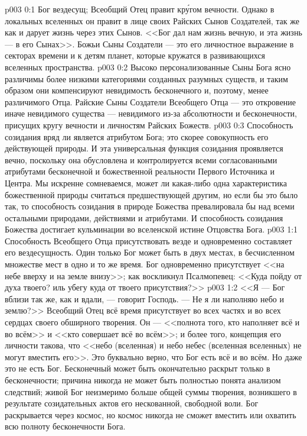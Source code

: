 \author{Божественный Советник}
\vs p003 0:1 Бог вездесущ; Всеобщий Отец правит кр\'угом вечности. Однако в локальных вселенных он правит в лице своих Райских Сынов Создателей, так же как и дарует жизнь через этих Сынов. <<Бог дал нам жизнь вечную, и эта жизнь --- в его Сынах>>. Божьи Сыны Создатели --- это его личностное выражение в секторах времени и к детям планет, которые кружатся в развивающихся вселенных пространства.
\vs p003 0:2 Высоко персонализованные Сыны Бога ясно различимы более низкими категориями созданных разумных существ, и таким образом они компенсируют невидимость бесконечного и, поэтому, менее различимого Отца. Райские Сыны Создатели Всеобщего Отца --- это откровение иначе невидимого существа --- невидимого из\hyp{}за абсолютности и бесконечности, присущих кругу вечности и личностям Райских Божеств.
\vs p003 0:3 \pc Способность созидания вряд ли является атрибутом Бога; это скорее совокупность его действующей природы. И эта универсальная функция созидания проявляется вечно, поскольку она обусловлена и контролируется всеми согласованными атрибутами бесконечной и божественной реальности Первого Источника и Центра. Мы искренне сомневаемся, может ли какая\hyp{}либо одна характеристика божественной природы считаться предшествующей другим, но если бы это было так, то способность созидания в природе Божества превалировала бы над всеми остальными природами, действиями и атрибутами. И способность созидания Божества достигает кульминации во вселенской истине Отцовства Бога.
\vs p003 1:1 Способность Всеобщего Отца присутствовать везде и одновременно составляет его вездесущность. Один только Бог может быть в двух местах, в бесчисленном множестве мест в одно и то же время. Бог одновременно присутствует <<на небе вверху и на земле внизу>>; как воскликнул Псалмопевец: <<Куда пойду от духа твоего? иль убегу куда от твоего присутствия?>>
\vs p003 1:2 <<Я --- Бог вблизи так же, как и вдали, --- говорит Господь. --- Не я ли наполняю небо и землю?>> Всеобщий Отец всё время присутствует во всех частях и во всех сердцах своего обширного творения. Он --- <<полнота того, кто наполняет всё и во всём>> и <<кто совершает всё во всём>>; и более того, концепция его личности такова, что <<небо (вселенная) и небо небес (вселенная вселенных) не могут вместить его>>. Это буквально верно, что Бог есть всё и во всём. Но даже это не есть  Бог. Бесконечный может быть окончательно раскрыт только в бесконечности; причина никогда не может быть полностью понята анализом следствий; живой Бог неизмеримо больше общей суммы творения, возникшего в результате созидательных актов его нескованной, свободной воли. Бог раскрывается через космос, но космос никогда не сможет вместить или охватить всю полноту бесконечности Бога.
